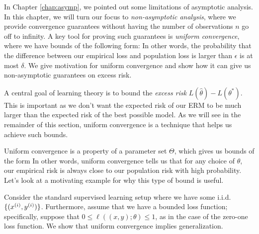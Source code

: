 \setcounter{section}{0}


In Chapter \ref{chap:asymp}, we pointed out some limitations of asymptotic analysis. In this chapter, we will turn our focus to \textit{non-asymptotic analysis}, where we provide convergence guarantees without having the number of observations $n$ go off to infinity. A key tool for proving such guarantees is \textit{uniform convergence}, where we have bounds of the following form:
In other words, the probability that the difference between our empirical loss and population loss is larger than $\epsilon$ is at most $\delta$. We give motivation for uniform convergence and show how it can give us non-asymptotic guarantees on excess risk.


A central goal of learning theory is to bound the \emph{excess risk} $L(\hat{\theta}) - L(\theta^*)$. This is important as we don't want the expected risk of our ERM to be much larger than the expected risk of the best possible model. As we will see in the remainder of this section, uniform convergence is a technique that helps us achieve such bounds.

Uniform convergence is a property of a parameter set $\Theta$, which gives us bounds of the form
In other words, uniform convergence tells us that for any choice of $\theta$, our empirical risk is always close to our population risk with high probability. Let's look at a motivating example for why this type of bound is useful.

\label{sec:uc-gen}

Consider the standard supervised learning setup where we have some i.i.d. $\{(x\sp{i}, y\sp{i})\}$. Furthermore, assume that we have a bounded loss function; specifically, suppose that $0 \leq \ell((x, y); \theta) \leq 1$, as in the case of the zero-one loss function. We show that uniform convergence implies generalization.

